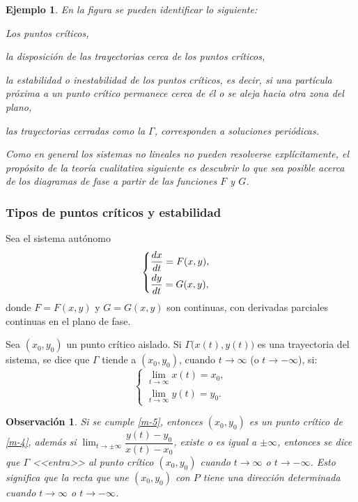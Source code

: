 \documentclass[a5paper,doc,10pt,noapacite]{apa6}
\newtheorem{observ}{Observación}
\newtheorem{ejem}{Ejemplo}
\begin{document}
{{\begin{ejem}
	
En la figura se pueden identificar lo siguiente:
	\begin{APAenumerate}
		\item Los puntos críticos,
		\item la disposición de las trayectorias cerca de los puntos críticos,
		\item la estabilidad o inestabilidad de los puntos críticos, es decir, si una partícula próxima a un punto crítico permanece cerca de él o se aleja hacia otra zona del plano,
		\item las trayectorias cerradas como la \(\Gamma\), corresponden a soluciones periódicas.
	\end{APAenumerate}

	\vspace{0.75\baselineskip}
	Como en general los sistemas no lineales no pueden resolverse explícitamente, el propósito de la teoría cualitativa siguiente es descubrir lo que sea posible acerca de los diagramas de fase a partir de las funciones \(F\) y \(G\).
\end{ejem}


%
%
%
\subsubsection{Tipos de puntos críticos y estabilidad}
%
%
%
Sea el sistema autónomo
\begin{equation}\label{m-4}
	\begin{cases}
		\dfrac{dx}{dt}=F(x,y) ,\vspace{0.3em}
		\\
		\dfrac{dy}{dt}=G(x,y),
	\end{cases}
\end{equation}
donde \(F=F(x,y)\) y \(G=G(x,y)\) son continuas, con derivadas parciales continuas en el plano de fase.

Sea \((x_0,y_0)\) un punto crítico aislado. Si \(\Gamma\big(x(t),y(t)\big)\) es una trayectoria del sistema, se dice que \(\Gamma\) tiende a \((x_0,y_0)\), cuando \(t\to\infty\) (o \(t\to-\infty\)), si:
\begin{equation}\label{m-5}
	\begin{cases}
		\lim_{t\to \infty} x(t) = x_0,
			 \\
		\lim_{t\to \infty} y(t) = y_0.
	\end{cases}
\end{equation}

\begin{observ}
	Si se cumple \eqref{m-5}, entonces \((x_0,y_0)\) es un punto crítico de \eqref{m-4}, además si \(\lim_{t\to\pm\infty}\dfrac{ y(t)-y_0}{x(t)-x_0}\), existe o es igual  a \(\pm\infty\), entonces se dice que \(\Gamma\) <<entra>> al punto crítico \((x_0,y_0)\) cuando \(t\to\infty\) o \(t\to-\infty\). Esto significa que la recta que une \((x_0,y_0)\) con \(P\) tiene una dirección determinada cuando \(t\to\infty\) o \(t\to-\infty\).
	

\end{observ}}}
\end{document}
